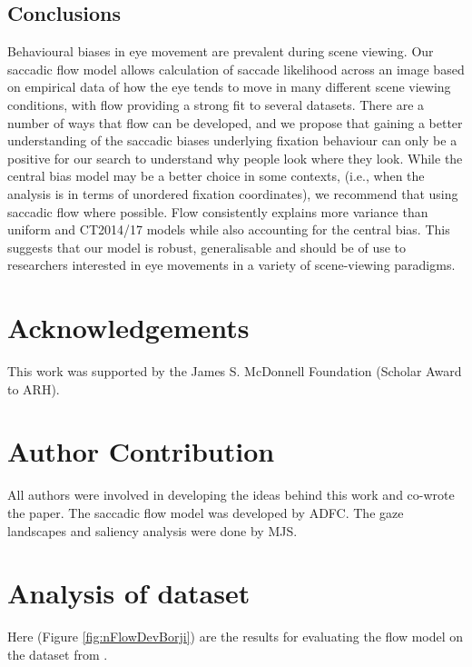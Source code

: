 \documentclass[a4paper, twocolumn, oneside, 11pt]{article}
\begin{document}
\subsection{Conclusions}
Behavioural biases in eye movement are prevalent during scene viewing. Our saccadic flow model allows calculation of saccade likelihood across an image based on empirical data of how the eye tends to move in many different scene viewing conditions, with flow providing a strong fit to several datasets. There are a number of ways that flow can be developed, and we propose that gaining a better understanding of the saccadic biases underlying fixation behaviour can only be a positive for our search to understand why people look where they look. While the central bias model may be a better choice in some contexts, (i.e., when the analysis is in terms of unordered fixation coordinates), we recommend that using saccadic flow where possible. Flow consistently explains more variance than uniform and CT2014/17 models while also accounting for the central bias. This suggests that our model is robust, generalisable and should be of use to researchers interested in eye movements in a variety of scene-viewing paradigms. 


\section*{Acknowledgements}

This work was supported by the James S. McDonnell Foundation (Scholar Award to ARH).

\section*{Author Contribution}

All authors were involved in developing the ideas behind this work and co-wrote the paper. The saccadic flow model was developed by ADFC. The gaze landscapes and saliency analysis were done by MJS.

\appendix



\section{Analysis of \cite{borji2015} dataset}

Here (Figure \ref{fig:nFlowDevBorji}) are the results for evaluating the flow model on the dataset from \cite{borji2015}.
\end{document}
